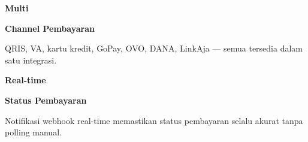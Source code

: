 \documentclass[a4paper]{article}
\begin{document}
\begin{minipage}[t]{0.485\textwidth}
    \noindent\colorbox{BlueBg}{%
        \begin{minipage}[t]{\dimexpr\linewidth-2\fboxsep}
            \vspace{6pt}
            {\fontsize{20}{24}\selectfont\bfseries\color{GreenPrimary} Multi}\par\vspace{2pt}
            {\fontsize{9.5}{12}\selectfont\bfseries\color{BlueDark} Channel Pembayaran}\par\vspace{2pt}
            {\fontsize{8.5}{11}\selectfont\color{TextDark}QRIS, VA, kartu kredit, GoPay, OVO, DANA, LinkAja --- semua tersedia dalam satu integrasi.}%
            \vspace{6pt}
        \end{minipage}}%
    \vspace{6pt}
    \noindent\colorbox{BlueBg}{%
        \begin{minipage}[t]{\dimexpr\linewidth-2\fboxsep}
            \vspace{6pt}
            {\fontsize{20}{24}\selectfont\bfseries\color{GreenPrimary} Real-time}\par\vspace{2pt}
            {\fontsize{9.5}{12}\selectfont\bfseries\color{BlueDark} Status Pembayaran}\par\vspace{2pt}
            {\fontsize{8.5}{11}\selectfont\color{TextDark}Notifikasi webhook real-time memastikan status pembayaran selalu akurat tanpa polling manual.}%
            \vspace{6pt}
        \end{minipage}}%
\end{minipage}

\vspace{8pt}
\end{document}
